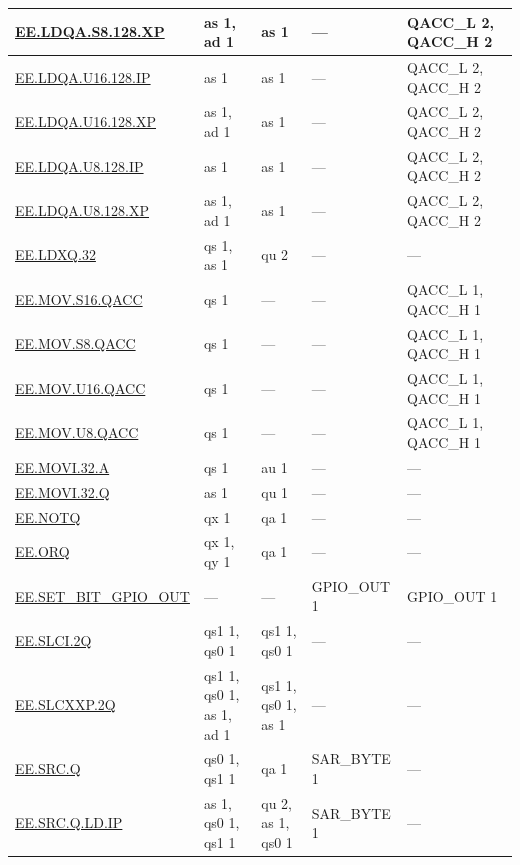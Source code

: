 \begin{longtable}[c]{|l|m{2.5cm}|m{2.5cm}|m{2.5cm}|m{2.5cm}|}
    \hyperref[instruction:EELDQAS8128XP]{EE.LDQA.S8.128.XP} & as 1, ad 1 & as 1 & — & QACC\_L 2, QACC\_H 2\\\hline
    \hyperref[instruction:EELDQAU16128IP]{EE.LDQA.U16.128.IP} & as 1 & as 1 & — & QACC\_L 2, QACC\_H 2\\\hline
    \hyperref[instruction:EELDQAU16128XP]{EE.LDQA.U16.128.XP} & as 1, ad 1 & as 1 & — & QACC\_L 2, QACC\_H 2\\\hline
    \hyperref[instruction:EELDQAU8128IP]{EE.LDQA.U8.128.IP} & as 1 & as 1 & — & QACC\_L 2, QACC\_H 2\\\hline
    \hyperref[instruction:EELDQAU8128XP]{EE.LDQA.U8.128.XP} & as 1, ad 1 & as 1 & — & QACC\_L 2, QACC\_H 2\\\hline
    \hyperref[instruction:EELDXQ32]{EE.LDXQ.32} & qs 1, as 1 & qu 2 & — & — \\\hline
    \hyperref[instruction:EEMOVS16QACC]{EE.MOV.S16.QACC} & qs 1 & — & — & QACC\_L 1, QACC\_H 1\\\hline
    \hyperref[instruction:EEMOVS8QACC]{EE.MOV.S8.QACC} & qs 1 & — & — & QACC\_L 1, QACC\_H 1\\\hline
    \hyperref[instruction:EEMOVU16QACC]{EE.MOV.U16.QACC} & qs 1 & — & — & QACC\_L 1, QACC\_H 1\\\hline
    \hyperref[instruction:EEMOVU8QACC]{EE.MOV.U8.QACC} & qs 1 & — & — & QACC\_L 1, QACC\_H 1\\\hline
    \hyperref[instruction:EEMOVI32A]{EE.MOVI.32.A} & qs 1 & au 1 & — & — \\\hline
    \hyperref[instruction:EEMOVI32Q]{EE.MOVI.32.Q} & as 1 & qu 1 & — & — \\\hline
    \hyperref[instruction:EENOTQ]{EE.NOTQ} & qx 1 & qa 1 & — & — \\\hline
    \hyperref[instruction:EEORQ]{EE.ORQ} & qx 1, qy 1 & qa 1 & — & — \\\hline
    \hyperref[instruction:EESETBITGPIOOUT]{EE.SET\_BIT\_GPIO\_OUT} & — & — & GPIO\_OUT 1 & GPIO\_OUT 1 \\\hline
    \hyperref[instruction:EESLCI2Q]{EE.SLCI.2Q} & qs1 1, qs0 1 & qs1 1, qs0 1 & — & — \\\hline
    \hyperref[instruction:EESLCXXP2Q]{EE.SLCXXP.2Q} & qs1 1, qs0 1, as 1, ad 1 & qs1 1, qs0 1, as 1 & — & — \\\hline
    \hyperref[instruction:EESRCQ]{EE.SRC.Q} & qs0 1, qs1 1 & qa 1 & SAR\_BYTE 1 & — \\\hline
    \hyperref[instruction:EESRCQLDIP]{EE.SRC.Q.LD.IP} & as 1, qs0 1, qs1 1 & qu 2, as 1, qs0 1 & SAR\_BYTE 1 & — \\\hline

\end{longtable}
